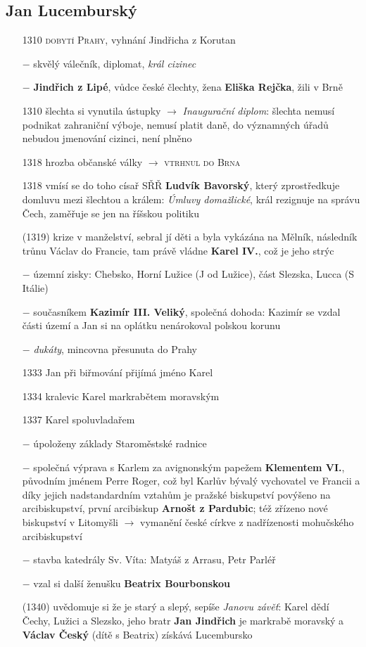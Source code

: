 \documentclass{article}
\begin{document}
\subsection*{Jan Lucemburský}
\begin{itemize}
    \vspace{-0.5em}
    \setlength\itemsep{0.15em}
    \item[1310] \textsc{dobytí Prahy}, vyhnání Jindřicha z Korutan
    \item[$-$] skvělý válečník, diplomat, \textit{král cizinec}
    \item[$-$] \textbf{Jindřich z Lipé}, vůdce české člechty, žena \textbf{Eliška Rejčka}, žili v Brně
    \item[1310] šlechta si vynutila ústupky $\rightarrow$ \textit{Inaugurační diplom}: šlechta nemusí podnikat zahraniční výboje, nemusí platit daně, do významných úřadů nebudou jmenování cizinci, není plněno
    \item[1318] hrozba občanské války $\rightarrow$ \textsc{vtrhnul do Brna}
    \item[1318] vmísí se do toho císař SŘŘ \textbf{Ludvík Bavorský}, který zprostředkuje domluvu mezi šlechtou a králem: \textit{Úmluvy domažlické}, král rezignuje na správu Čech, zaměřuje se jen na říšskou politiku
    \item[(1319)] krize v manželství, sebral jí děti a byla vykázána na Mělník, následník trůnu Václav do Francie, tam právě vládne \textbf{Karel IV.}, což je jeho strýc
    \item[$-$] územní zisky: Chebsko, Horní Lužice (J od Lužice), část Slezska, Lucca (S Itálie)
    \item[$-$] současníkem \textbf{Kazimír III. Veliký}, společná dohoda: Kazimír se vzdal části území a Jan si na oplátku nenárokoval polskou korunu
    \item[$-$] \textit{dukáty}, mincovna přesunuta do Prahy
    \item[1333] Jan při biřmování přijímá jméno Karel
    \item[1334] kralevic Karel markrabětem moravským
    \item[1337] Karel spoluvladařem
    \item[$-$] úpoloženy základy Staroměstské radnice
    \item[$-$] společná výprava s Karlem za avignonským papežem \textbf{Klementem VI.}, původním jménem Perre Roger, což byl Karlův bývalý vychovatel ve Francii a díky jejich nadstandardním vztahům je pražské biskupství povýšeno na arcibiskupství, první arcibiskup \textbf{Arnošt z Pardubic}; též zřízeno nové biskupství v Litomyšli $\rightarrow$ vymanění české církve z nadřízenosti mohučského arcibiskupství
    \item[$-$] stavba katedrály Sv. Víta: Matyáš z Arrasu, Petr Parléř
    \item[$-$] vzal si další ženušku \textbf{Beatrix Bourbonskou}
    \item[(1340)] uvědomuje si že je starý a slepý, sepíše \textit{Janovu závěť}: Karel dědí Čechy, Lužici a Slezsko, jeho bratr \textbf{Jan Jindřich} je markrabě moravský a \textbf{Václav Český} (dítě s Beatrix) získává Lucembursko  
\end{itemize}
\end{document}
